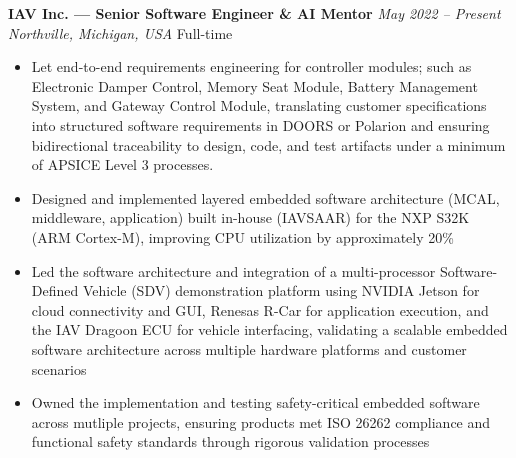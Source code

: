 \documentclass[11pt,letterpaper]{article}
\newcommand{\RoleHeading}[4]{%
  {\bfseries#1} \hfill {\itshape#2}\\
  {\itshape#3} \hfill #4
}
\newenvironment{jobenvironment}[4]{%
  \needspace{2cm}
  \vspace{0.15cm}
  \RoleHeading{#1}{#2}{#3}{#4}
  \vspace{0.05cm}
  \begin{itemize}[leftmargin=0.2in, itemsep=0.05cm, parsep=0cm]
}{%
  \end{itemize}
}
\begin{document}
\begin{jobenvironment}
  {IAV Inc. — Senior Software Engineer \& AI Mentor}
  {May 2022 -- Present}
  {Northville, Michigan, USA}
  {Full-time}

  \item Let end-to-end requirements engineering for controller modules; such as Electronic Damper Control, Memory Seat Module, Battery Management System, and Gateway Control Module, translating customer specifications into structured software requirements in DOORS or Polarion and ensuring bidirectional traceability to design, code, and test artifacts under a minimum of APSICE Level 3 processes.

  \item Designed and implemented layered embedded software architecture (MCAL, middleware, application) built in-house (IAVSAAR) for the NXP S32K (ARM Cortex-M), improving CPU utilization by approximately 20\%

  \item Led the software architecture and integration of a multi-processor Software-Defined Vehicle (SDV) demonstration platform using NVIDIA Jetson for cloud connectivity and GUI, Renesas R-Car for application execution, and the IAV Dragoon ECU for vehicle interfacing, validating a scalable embedded software architecture across multiple hardware platforms and customer scenarios

  \item Owned the implementation and testing safety-critical embedded software across mutliple projects, ensuring products met ISO 26262 compliance and functional safety standards through rigorous validation processes


\end{jobenvironment}
\end{document}
